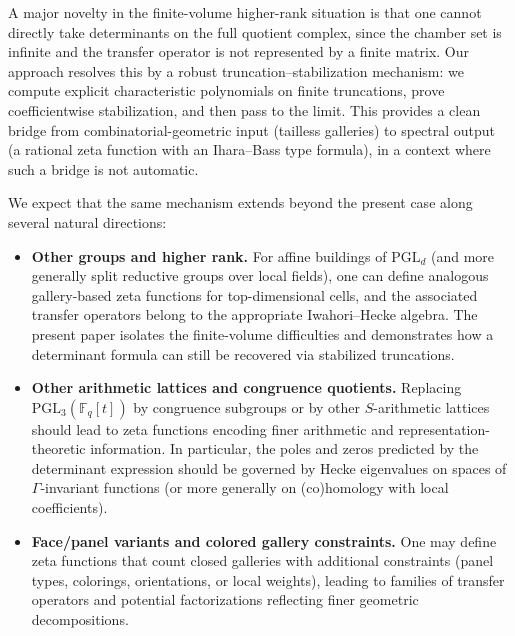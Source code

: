 \documentclass[11pt]{amsart}
\theoremstyle{definition}
\theoremstyle{remark}
\numberwithin{equation}{section}
\begin{document}
\medskip

A major novelty in the finite-volume higher-rank situation is that one cannot
directly take determinants on the full quotient complex, since the chamber set
is infinite and the transfer operator is not represented by a finite matrix.
Our approach resolves this by a robust truncation--stabilization mechanism:
we compute explicit characteristic polynomials on finite truncations,
prove coefficientwise stabilization, and then pass to the limit.
This provides a clean bridge from combinatorial-geometric input (tailless galleries)
to spectral output (a rational zeta function with an Ihara--Bass type formula),
in a context where such a bridge is not automatic.

\medskip

We expect that the same mechanism extends beyond the present case along several
natural directions:

\begin{itemize}
\item \textbf{Other groups and higher rank.}
For affine buildings of $\mathrm{PGL}_{d}$ (and more generally split reductive
groups over local fields), one can define analogous gallery-based zeta functions
for top-dimensional cells, and the associated transfer operators belong to the
appropriate Iwahori--Hecke algebra.
The present paper isolates the finite-volume difficulties and demonstrates
how a determinant formula can still be recovered via stabilized truncations.

\item \textbf{Other arithmetic lattices and congruence quotients.}
Replacing $\mathrm{PGL}_{3}(\mathbb{F}_{q}[t])$ by congruence subgroups or by
other $S$-arithmetic lattices should lead to zeta functions encoding finer
arithmetic and representation-theoretic information.
In particular, the poles and zeros predicted by the determinant expression
should be governed by Hecke eigenvalues on spaces of $\Gamma$-invariant functions
(or more generally on (co)homology with local coefficients).

\item \textbf{Face/panel variants and colored gallery constraints.}
One may define zeta functions that count closed galleries with additional
constraints (panel types, colorings, orientations, or local weights),
leading to families of transfer operators and potential factorizations
reflecting finer geometric decompositions.
\end{itemize}

\medskip
\end{document}
